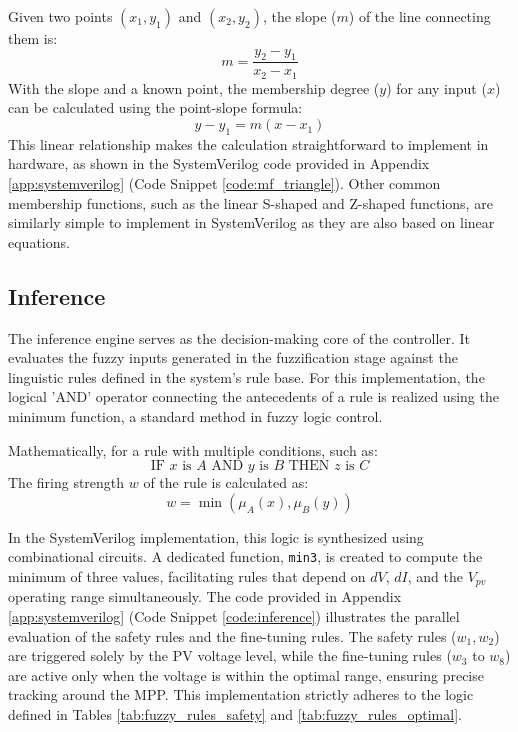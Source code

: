 \documentclass[a4paper,oneside,12pt]{report}
\numberwithin{equation}{chapter}
\begin{document}
Given two points $(x_1, y_1)$ and $(x_2, y_2)$, the slope ($m$) of the line connecting them is:
\begin{equation}
    m = \frac{y_2 - y_1}{x_2 - x_1}
\end{equation}
With the slope and a known point, the membership degree ($y$) for any input ($x$) can be calculated using the point-slope formula:
\begin{equation}
    y - y_1 = m(x - x_1)
\end{equation}
This linear relationship makes the calculation straightforward to implement in hardware, as shown in the SystemVerilog code provided in Appendix \ref{app:systemverilog} (Code Snippet \ref{code:mf_triangle}).
Other common membership functions, such as the linear S-shaped and Z-shaped functions, are similarly simple to implement in SystemVerilog as they are also based on linear equations.

\subsection{Inference}
\label{sec:sv_inference}
The inference engine serves as the decision-making core of the controller. It evaluates the fuzzy inputs generated in the fuzzification stage against the linguistic rules defined in the system's rule base. For this implementation, the logical 'AND' operator connecting the antecedents of a rule is realized using the minimum function, a standard method in fuzzy logic control.

Mathematically, for a rule with multiple conditions, such as:
\begin{equation}
    \text{IF } x \text{ is } A \text{ AND } y \text{ is } B \text{ THEN } z \text{ is } C
\end{equation}
The firing strength $w$ of the rule is calculated as:
\begin{equation}
    w = \min(\mu_A(x), \mu_B(y))
\end{equation}

In the SystemVerilog implementation, this logic is synthesized using combinational circuits. A dedicated function, \texttt{min3}, is created to compute the minimum of three values, facilitating rules that depend on $dV$, $dI$, and the $V_{pv}$ operating range simultaneously. The code provided in Appendix \ref{app:systemverilog} (Code Snippet \ref{code:inference}) illustrates the parallel evaluation of the safety rules and the fine-tuning rules. The safety rules ($w_1, w_2$) are triggered solely by the PV voltage level, while the fine-tuning rules ($w_3$ to $w_8$) are active only when the voltage is within the optimal range, ensuring precise tracking around the MPP. This implementation strictly adheres to the logic defined in Tables \ref{tab:fuzzy_rules_safety} and \ref{tab:fuzzy_rules_optimal}.
\end{document}
